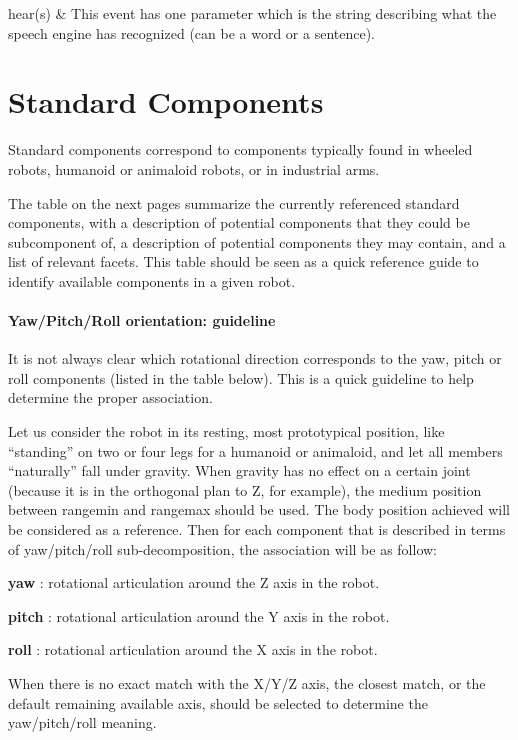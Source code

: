 \begin{slots}
hear(s) &
This event has one parameter which is
the string describing what the speech engine has recognized (can be a
word or a sentence).\\\hline
\end{slots}
\section{Standard Components}

Standard components correspond to components typically found in wheeled
robots, humanoid or animaloid robots, or in industrial arms.


The table on the next pages summarize the currently referenced standard
components, with a description of potential components that they could
be subcomponent of, a description of potential components they may
contain, and a list of relevant facets. This table should be seen as a
quick reference guide to identify available components in a given
robot.

\paragraph{Yaw/Pitch/Roll orientation: guideline}


It is not always clear which rotational direction corresponds to the
yaw, pitch or roll components (listed in the table below). This is a
quick guideline to help determine the proper association.


Let us consider the robot in its resting, most prototypical position,
like “standing” on two or four legs for a humanoid or animaloid, and
let all members “naturally” fall under gravity. When gravity has no
effect on a certain joint (because it is in the orthogonal plan to Z,
for example), the medium position between rangemin and rangemax should
be used. The body position achieved will be considered as a reference.
Then for each component that is described in terms of yaw/pitch/roll
sub-decomposition, the association will be as follow:

{
\textbf{ yaw} : rotational articulation around the Z
axis in the robot.}


\textbf{ pitch} : rotational articulation around the Y axis in the
robot.


\textbf{ roll} : rotational articulation around the X axis in the
robot.


When there is no exact match with the X/Y/Z axis, the closest match, or
the default remaining available axis, should be selected to determine
the yaw/pitch/roll meaning.

